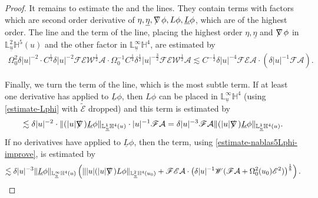 \documentclass[11pt,reqno]{amsart}
\theoremstyle{definition}
\numberwithin{equation}{section}
\renewcommand{\L}{\mathbb{L}}
\renewcommand{\H}{\mathbb{H}}
\def\etab{\underline{\eta}}
\def\Lb{\underline{L}}
\def\ub{\underline{u}}
\def\nablas{\mbox{$\nabla \mkern -13mu /$ }}
\begin{document}
\begin{proof}
It remains to estimate the  and the  lines. They contain terms with factors which are second order derivative of $\eta,\etab,\nablas\phi,L\phi,\Lb\phi$, which are of the highest order. The  line and the  term of the  line, placing the highest order $\eta,\etab$ and $\nablas\phi$ in $\L^2_{\ub}\H^5(u)$ and the other factor in $\L^\infty_{\ub}\H^4$, are estimated by
\begin{align*}
\Omega_0^2\delta|u|^{-2}\cdot C^{\frac{1}{4}}\delta|u|^{-2}\mathscr{F}\mathscr{E}\mathscr{W}^{\frac{1}{2}}\mathcal{A}\cdot \Omega_0^{-1}C^{\frac{1}{4}}\delta^{\frac{1}{2}}|u|^{-\frac{3}{2}}\mathscr{F}\mathscr{E}\mathscr{W}^{\frac{1}{2}}\mathcal{A}\lesssim C^{-\frac{1}{2}}\delta|u|^{-4}\mathscr{F}\mathscr{E}\mathcal{A}\cdot(\delta|u|^{-1}\mathscr{F}\mathcal{A}).
\end{align*}

Finally, we turn the  term of the  line, which is the most subtle term. If at least one derivative has applied to $\Lb\phi$, then $L\phi$ can be placed in $\L^\infty_{\ub}\H^4$ (using \eqref{estimate-Lphi} with $\widetilde{\mathcal{E}}$ dropped) and this term is estimated by
\begin{align*}
\lesssim\delta|u|^{-2}\cdot\|(|u|\nablas)\Lb\phi\|_{\L^1_{\ub}\H^4(u)}\cdot|u|^{-1}\mathscr{F}\mathcal{A}=\delta|u|^{-3}\mathscr{F}\mathcal{A}\|(|u|\nablas)\Lb\phi\|_{\L^1_{\ub}\H^4(u)}.
\end{align*}
If no derivatives have applied to $\Lb\phi$, then the term, using \eqref{estimate-nablas5Lphi-improve}, is estimated by
\begin{align*}
\lesssim\delta|u|^{-3}\|\Lb\phi\|_{\L^\infty_{\ub}\H^4(u)}\left(\||u|(|u|\nablas)L\phi\|_{\L^2_{\ub}\H^4(u_0)}+\mathscr{F}\mathscr{E}\mathcal{A}\cdot\left(\delta|u|^{-1}\mathscr{W}(\mathscr{F}\mathcal{A}+\Omega_0^2(u_0)\mathscr{E}^2)\right)^{\frac{1}{8}}\right).
\end{align*}


\end{proof}
\end{document}
